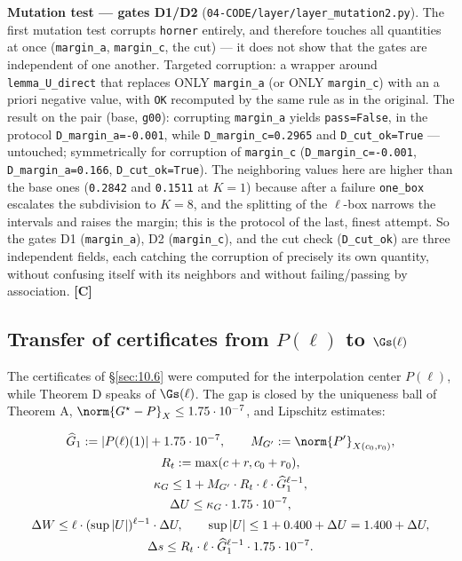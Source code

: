 \textbf{Mutation test --- gates D1/D2} (\texttt{04-\allowbreak CODE/\allowbreak layer/\allowbreak layer\_\allowbreak mutation2.py}).
The first mutation test corrupts \texttt{horner} entirely, and therefore touches
all quantities at once (\texttt{margin\_a}, \texttt{margin\_c}, the cut) --- it does not show that
the gates are independent of one another. Targeted corruption: a wrapper around
\texttt{lemma\_\allowbreak U\_\allowbreak direct} that replaces ONLY \texttt{margin\_a} (or ONLY \texttt{margin\_c}) with an a priori
negative value, with \texttt{OK} recomputed by the same rule as in the original. The result
on the pair (base, \texttt{g00}): corrupting \texttt{margin\_a} yields \texttt{pass=False}, in the protocol
\texttt{D\_\allowbreak margin\_\allowbreak a=-0.001}, while \texttt{D\_\allowbreak margin\_\allowbreak c=0.2965} and \texttt{D\_\allowbreak cut\_\allowbreak ok=True} --- untouched; symmetrically
for corruption of \texttt{margin\_c} (\texttt{D\_\allowbreak margin\_\allowbreak c=-0.001}, \texttt{D\_\allowbreak margin\_\allowbreak a=0.166}, \texttt{D\_\allowbreak cut\_\allowbreak ok=True}).
The neighboring values here are higher than the base ones (\texttt{0.2842} and \texttt{0.1511} at $K=1$)
because after a failure \texttt{one\_box} escalates the subdivision to $K=8$, and the splitting
of the $\ell$-box narrows the intervals and raises the margin; this is the protocol of the last,
finest attempt. So the gates D1 (\texttt{margin\_a}), D2 (\texttt{margin\_c}), and the cut check (\texttt{D\_cut\_ok})
are three independent fields, each catching the corruption of precisely its own quantity,
without confusing itself with its neighbors and without failing/passing by association. \textbf{[C]}


\subsection{Transfer of certificates from $P(\ell)$ to $\Gs(\ell)$}\label{sec:10.7}

The certificates of \S\ref{sec:10.6} were computed for the interpolation center $P(\ell)$, while
Theorem D speaks of $\Gs(\ell)$. The gap is closed by the uniqueness ball of Theorem A,
$\norm{G^{\star} - P}_X \le 1.75\cdot 10^{-7}$, and Lipschitz estimates:

\begin{gather*}
\widehat{G}_{1} := |P(\ell)(1)| + 1.75\cdot 10^{-7}, \qquad M_{G'} := \norm{P'}_{X(c_{0},r_{0})}, \\
R_t := \max(c+r, c_{0}+r_{0}), \\
\kappa_G \le 1 + M_{G'} \cdot R_t \cdot \ell \cdot \widehat{G}_{1}^{\ell-1}, \\
\Delta U \le \kappa_G \cdot 1.75\cdot 10^{-7}, \\
\Delta W \le \ell \cdot (\sup|U|)^{\ell-1} \cdot \Delta U, \qquad \sup|U| \le 1 + 0.400 + \Delta U = 1.400 + \Delta U, \\
\Delta s \le R_t \cdot \ell \cdot \widehat{G}_{1}^{\ell-1} \cdot 1.75\cdot 10^{-7}.
\end{gather*}

